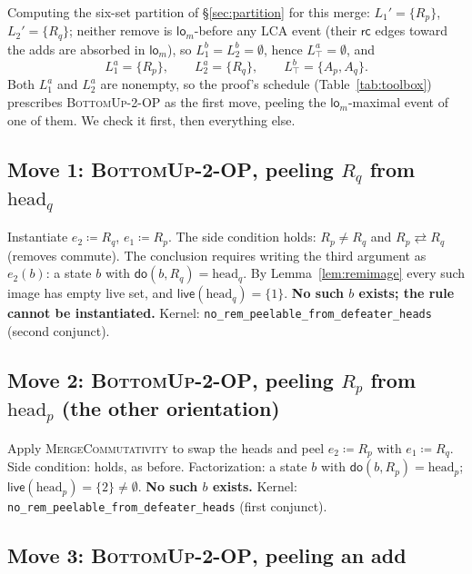 \documentclass[11pt]{article}
\newcommand{\rcrel}{\mathsf{rc}}
\newcommand{\comm}{\rightleftarrows}
\newcommand{\lom}{\mathsf{lo}_m}
\newcommand{\lean}[1]{\texttt{#1}}
\newcommand{\live}{\mathsf{live}}
\newcommand{\Ap}{A_p}
\newcommand{\Aq}{A_q}
\newcommand{\Rp}{R_p}
\newcommand{\Rq}{R_q}
\begin{document}
Computing the six-set partition of \S\ref{sec:partition} for this
merge: $L_1' = \{\Rp\}$, $L_2' = \{\Rq\}$; neither remove is
$\lom$-before any LCA event (their $\rcrel$ edges toward the adds are
absorbed in $\lom$), so $L_1^b = L_2^b = \emptyset$, hence
$L_\top^a = \emptyset$, and
\[
  L_1^a = \{\Rp\}, \qquad L_2^a = \{\Rq\}, \qquad
  L_\top^b = \{\Ap, \Aq\}.
\]
Both $L_1^a$ and $L_2^a$ are nonempty, so the proof's schedule
(Table~\ref{tab:toolbox}) prescribes \textsc{BottomUp-2-OP} as the
first move, peeling the $\lom$-maximal event of one of them. We check
it first, then everything else.

\subsection{Move 1: \textsc{BottomUp-2-OP}, peeling $\Rq$ from
$\mathrm{head}_q$}
\label{sec:move1}

Instantiate $e_2 \coloneqq \Rq$, $e_1 \coloneqq \Rp$. The side
condition holds: $\Rp \neq \Rq$ and $\Rp \comm \Rq$ (removes commute).
The conclusion requires writing the third argument as
$e_2(b)$: a state $b$ with $\mathsf{do}(b, \Rq) = \mathrm{head}_q$.
By Lemma~\ref{lem:remimage} every such image has empty live set, and
$\live(\mathrm{head}_q) = \{1\}$. \textbf{No such $b$ exists; the rule
cannot be instantiated.} Kernel:
\lean{no\_rem\_peelable\_from\_defeater\_heads} (second conjunct).

\subsection{Move 2: \textsc{BottomUp-2-OP}, peeling $\Rp$ from
$\mathrm{head}_p$ (the other orientation)}

Apply \textsc{MergeCommutativity} to swap the heads and peel
$e_2 \coloneqq \Rp$ with $e_1 \coloneqq \Rq$. Side condition: holds,
as before. Factorization: a state $b$ with
$\mathsf{do}(b, \Rp) = \mathrm{head}_p$; $\live(\mathrm{head}_p) =
\{2\} \neq \emptyset$. \textbf{No such $b$ exists.} Kernel:
\lean{no\_rem\_peelable\_from\_defeater\_heads} (first conjunct).

\subsection{Move 3: \textsc{BottomUp-2-OP}, peeling an add}
\label{sec:move3}
\end{document}
